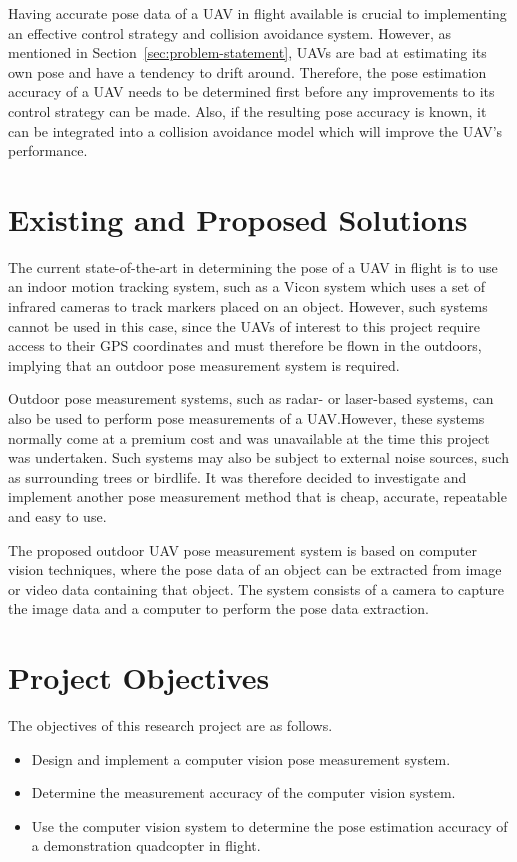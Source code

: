 Having accurate pose data of a UAV in flight available is crucial to implementing an effective control strategy and collision avoidance system. However, as mentioned in Section~\ref{sec:problem-statement}, UAVs are bad at estimating its own pose and have a tendency to drift around. Therefore, the pose estimation accuracy of a UAV needs to be determined first before any improvements to its control strategy can be made. Also, if the resulting pose accuracy is known, it can be integrated into a collision avoidance model which will improve the UAV's performance. 

\section{Existing and Proposed Solutions}

The current state-of-the-art in determining the pose of a UAV in flight is to use an indoor motion tracking system, such as a Vicon system which uses a set of infrared cameras to track markers placed on an object. However, such systems cannot be used in this case, since the UAVs of interest to this project require access to their GPS coordinates and must therefore be flown in the outdoors, implying that an outdoor pose measurement system is required. 

Outdoor pose measurement systems, such as radar- or laser-based systems, can also be used to perform pose measurements of a UAV.\@ However, these systems normally come at a premium cost  and was unavailable at the time this project was undertaken. Such systems may also be subject to external noise sources, such as surrounding trees or birdlife. It was therefore decided to investigate and implement another pose measurement method that is cheap, accurate, repeatable and easy to use. 

The proposed outdoor UAV pose measurement system is based on computer vision techniques, where the pose data of an object can be extracted from image or video data containing that object. The system consists of a camera to capture the image data and a computer to perform the pose data extraction. 

\section{Project Objectives}

The objectives of this research project are as follows. 

\begin{itemize}
  \item Design and implement a computer vision pose measurement system.
  \item Determine the measurement accuracy of the computer vision system.
  \item Use the computer vision system to determine the pose estimation accuracy of a demonstration quadcopter in flight. 
\end{itemize}

